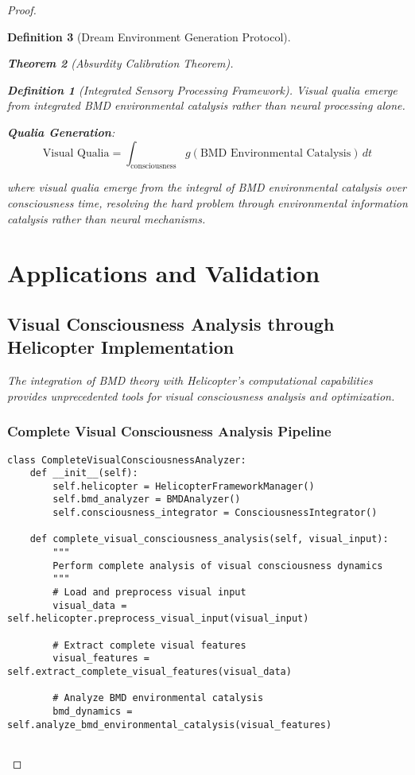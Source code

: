 \documentclass[12pt,a4paper]{article}
\newtheorem{theorem}{Theorem}[section]
\newtheorem{definition}[theorem]{Definition}
\begin{document}
\begin{proof}
\begin{definition}[Dream Environment Generation Protocol]
\begin{theorem}[Absurdity Calibration Theorem]
\begin{observation}
\begin{definition}[Integrated Sensory Processing Framework]
Visual qualia emerge from integrated BMD environmental catalysis rather than neural processing alone.

\textbf{Qualia Generation}:
$$\text{Visual Qualia} = \int_{\text{consciousness}} g(\text{BMD Environmental Catalysis}) \, dt$$

where visual qualia emerge from the integral of BMD environmental catalysis over consciousness time, resolving the hard problem through environmental information catalysis rather than neural mechanisms.

\section{Applications and Validation}

\subsection{Visual Consciousness Analysis through Helicopter Implementation}

The integration of BMD theory with Helicopter's computational capabilities provides unprecedented tools for visual consciousness analysis and optimization.

\subsubsection{Complete Visual Consciousness Analysis Pipeline}

\begin{lstlisting}[style=pythonstyle, caption=Complete Visual Consciousness Analysis]
class CompleteVisualConsciousnessAnalyzer:
    def __init__(self):
        self.helicopter = HelicopterFrameworkManager()
        self.bmd_analyzer = BMDAnalyzer()
        self.consciousness_integrator = ConsciousnessIntegrator()
        
    def complete_visual_consciousness_analysis(self, visual_input):
        """
        Perform complete analysis of visual consciousness dynamics
        """
        # Load and preprocess visual input
        visual_data = self.helicopter.preprocess_visual_input(visual_input)
        
        # Extract complete visual features
        visual_features = self.extract_complete_visual_features(visual_data)
        
        # Analyze BMD environmental catalysis
        bmd_dynamics = self.analyze_bmd_environmental_catalysis(visual_features)
        

\end{lstlisting}
\end{definition}
\end{observation}
\end{theorem}
\end{definition}
\end{proof}
\end{document}

